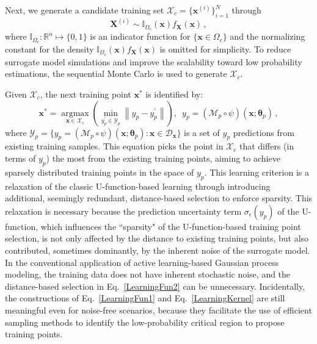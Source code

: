 \documentclass[number,preprint,3p]{elsarticle}
\def\rn{\mathbb{R}^n}
\newcommand{\1}[2]{\mathbb{I}_{#1}\left(#2\right)}
\newcommand{\vect}[1]{\boldsymbol{#1}}
\begin{document}
 Next, we generate a candidate training set  ${\mathcal{X}}_c=\{\vect x^{(i)}\}_{i=1}^N$ through 
 \begin{equation}\label{LearningKernel}
     \vect X^{(i)}\sim\1{\Omega_c}{\vect x}f_{\vect X}(\vect x)\,,
 \end{equation}
 where $\mathbb{I}_{\Omega_c}:\rn\mapsto\{0,1\}$ is an indicator function for $\{\vect x\in\Omega_c\}$ and the normalizing constant for the density $\1{\Omega_c}{\vect x}f_{\vect X}(\vect x)$ is omitted for simplicity. To reduce surrogate model simulations and improve the scalability toward low probability estimations, the sequential Monte Carlo \cite{papaioannou2016sequential,wang2019hamiltonian,xian2023relaxation} is used to generate ${\mathcal{X}}_c$. 
 
 Given ${\mathcal{X}}_c$, the  next training point $\vect{x}^{\ast}$ is identified by:
	\begin{equation}\label{LearningFun2}
		\vect{x}^{\ast}=\mathop{\arg\max}\limits_{\vect{x}\in {\mathcal{X}}_c} \left ( \mathop{\min}\limits_{y_p^\prime \in{\mathcal{Y}_p}}\left\|{y}_p-{y}_p^\prime \right \| \right ),\,\,\, y_{p}=(\mathcal{M}_{p}\circ\psi)(\vect{x};\vect{\theta}_{p})\,,
	\end{equation}
 where $\mathcal{Y}_p=\{y_{p}=(\mathcal{M}_{p}\circ\psi)(\vect{x};\vect{\theta}_{p}):\vect x\in\mathcal{D}_{\vect x}\}$ is a set of $y_p$ predictions from existing training samples. This equation picks the point in $\mathcal{X}_c$ that differs (in terms of $y_p$) the most from the existing training points, aiming to achieve sparsely distributed training points in the space of $y_p$. This learning criterion is a relaxation of the classic U-function-based learning \cite{echard2011ak} through introducing additional, seemingly redundant, distance-based selection to enforce sparsity. This relaxation is necessary because the prediction uncertainty term $\sigma_\epsilon(y_p)$ of the U-function, which influences the ``sparsity" of the U-function-based training point selection, is not only affected by the distance to existing training points, but also contributed, sometimes dominantly, by the inherent noise of the surrogate model. In the conventional application \cite{echard2011ak,echard2013combined,huang2016assessing} of active learning-based Gaussian process modeling, the training data does not have inherent stochastic noise, and the distance-based selection in Eq.~\eqref{LearningFun2} can be unnecessary. Incidentally, the constructions of Eq.~\eqref{LearningFun1} and Eq.~\eqref{LearningKernel} are still meaningful even for noise-free scenarios, because they facilitate the use of efficient sampling methods to identify the low-probability critical region to propose training points. 
	
\end{document}
